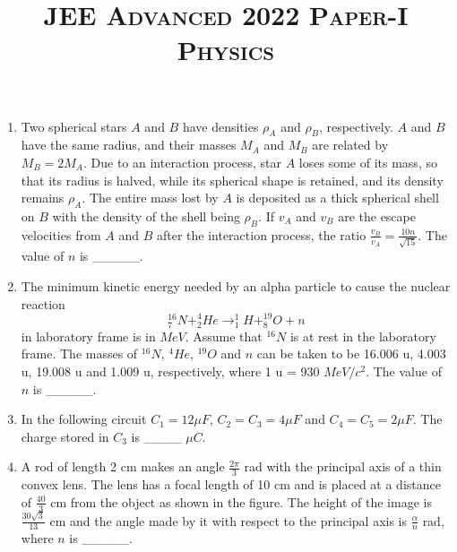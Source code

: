 \documentclass{article}
\title{\textsc{JEE Advanced 2022 Paper-I\\Physics}}
\date{}
\begin{document}
\maketitle


\begin{enumerate}
    \item Two spherical stars \(A\) and \(B\) have densities \(\rho_A\) and \(\rho_B\), respectively. \(A\) and \(B\) have the same radius, and their masses \(M_A\) and \(M_B\) are related by \(M_B = 2M_A\). Due to an interaction process, star \(A\) loses some of its mass, so that its radius is halved, while its spherical shape is retained, and its density remains \( \rho_A \). The entire mass lost by \(A\) is deposited as a thick spherical shell on \(B\) with the density of the shell being \( \rho_B \). If \( v_{A} \) and \( v_{B} \) are the escape velocities from \(A\) and \(B\) after the interaction process, the ratio \( \frac{v_{B}}{v_{A}} = \frac{10n}{\sqrt{15}} \). The value of \(n\) is \_\_\_\_\_.

    \item The minimum kinetic energy needed by an alpha particle to cause the nuclear reaction \[ ^{16}_{7}N + ^{4}_{2}He \rightarrow ^{1}_{1}H + ^{19}_{8}O + n \] in laboratory frame is in \(MeV\). Assume that \(^{16}N\) is at rest in the laboratory frame. The masses of \(^{16}N\), \(^{4}He\), \(^{19}O\) and \(n\) can be taken to be 16.006 u, 4.003 u, 19.008 u and 1.009 u, respectively, where 1 u = 930 \(MeV/c^2\). The value of \(n\) is \_\_\_\_\_.

    \item In the following circuit \(C_1 = 12 \mu F\), \(C_2 = C_3 = 4 \mu F\) and \(C_4 = C_5 = 2 \mu F\). The charge stored in \(C_3\) is \_\_\_\_ \(\mu C\).
    \begin{center}
    \end{center}

    \item A rod of length 2 cm makes an angle \(\frac{2\pi}{3}\) rad with the principal axis of a thin convex lens. The lens has a focal length of 10 cm and is placed at a distance of \(\frac{40}{3}\) cm from the object as shown in the figure. The height of the image is \(\frac{30 \sqrt{3}}{13}\) cm and the angle made by it with respect to the principal axis is \(\frac{\alpha}{n}\) rad, where \(n\) is \_\_\_\_\_.
    \begin{center}
    \end{center}


\end{enumerate}
\end{document}
